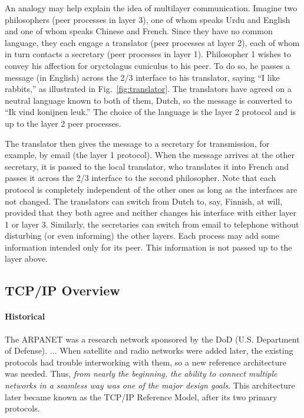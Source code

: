 An analogy may help explain the idea of multilayer communication. Imagine two philosophers
(peer processes in layer 3), one of whom speaks Urdu and English and one of whom speaks
Chinese and French. Since they have no common language, they each engage a translator
(peer processes at layer 2), each of whom in turn contacts a secretary (peer processes in
layer 1). Philosopher 1 wishes to convey his affection for oryctolagus cuniculus to his
peer. To do so, he passes a message (in English) across the 2/3 interface to his
translator, saying ``I like rabbits,'' as illustrated in Fig.~\ref{fig:translator}. The
translators have agreed on a neutral language known to both of them, Dutch, so the message
is converted to ``Ik vind konijnen leuk.'' The choice of the language is the layer 2
protocol and is up to the layer 2 peer processes.

The translator then gives the message to a secretary for transmission, for example, by
email (the layer 1 protocol). When the message arrives at the other secretary, it is
passed to the local translator, who translates it into French and passes it across the 2/3
interface to the second philosopher. Note that each protocol is completely independent of
the other ones as long as the interfaces are not changed. The translators can switch from
Dutch to, say, Finnish, at will, provided that they both agree and neither changes his
interface with either layer 1 or layer 3. Similarly, the secretaries can switch from email
to telephone without disturbing (or even informing) the other layers. Each process may add
some information intended only for its peer. This information is not passed up to the
layer above.

\subsection{TCP/IP Overview}

\paragraph{Historical}

  The ARPANET was a research network sponsored by the DoD (U.S. Department of
  Defense). ...  When satellite and radio networks were added later, the existing
  protocols had trouble interworking with them, so a new reference architecture was
  needed. Thus, \emph{from nearly the beginning, the ability to connect multiple networks in
    a seamless way was one of the major design goals}.  This architecture later became
  known as the TCP/IP Reference Model, after its two primary protocols. 

